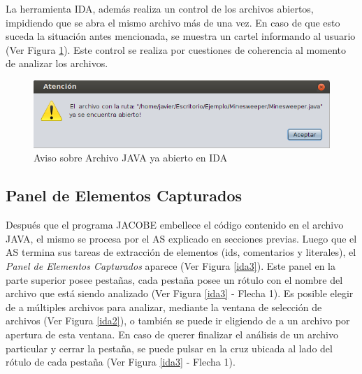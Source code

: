 La herramienta IDA, además realiza un control de los archivos abiertos, impidiendo que se abra el mismo archivo más de una vez. En caso de que esto suceda la situación antes mencionada, se muestra un cartel informando al usuario (Ver Figura \ref{idaWar2}). Este control se realiza por cuestiones de coherencia al momento de analizar los archivos.




\begin{figure}[t] %
\centerline{%
\includegraphics[scale= 0.8]{./cap4/ida_war_02.png}
}
\caption{Aviso sobre Archivo JAVA ya abierto en IDA}
\label{idaWar2}
\end{figure}



\subsection{Panel de Elementos Capturados}

Después que el programa JACOBE embellece el código contenido en el archivo JAVA,
el mismo se procesa por el AS explicado en secciones previas. Luego que el AS termina sus tareas de extracción de elementos (ids, comentarios y literales), el \textit{Panel de Elementos Capturados} aparece (Ver Figura \ref{ida3}). Este panel en la parte superior posee pestañas, cada pestaña posee un rótulo con el nombre del archivo que está siendo analizado (Ver Figura \ref{ida3} - Flecha 1). Es posible elegir de a múltiples archivos para analizar, mediante la ventana de selección de archivos (Ver Figura \ref{ida2}), o también se puede ir eligiendo de a un archivo por apertura de esta ventana.  En caso de querer finalizar el análisis de un archivo particular y cerrar la pestaña, se puede pulsar en la cruz ubicada al lado del rótulo de cada pestaña (Ver Figura \ref{ida3} - Flecha 1).

